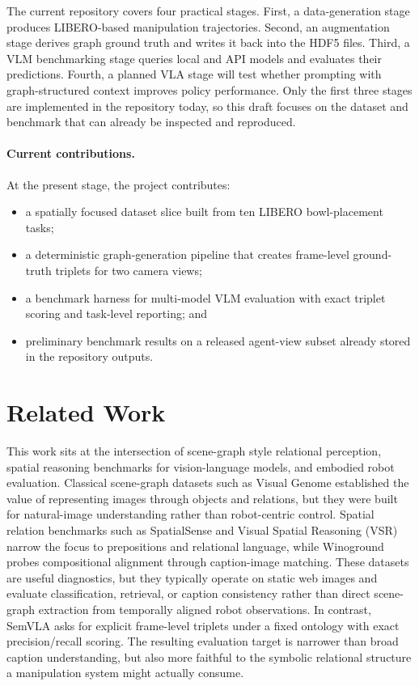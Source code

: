\documentclass{article}
\begin{document}
The current repository covers four practical stages. First, a data-generation stage produces LIBERO-based manipulation trajectories. Second, an augmentation stage derives graph ground truth and writes it back into the HDF5 files. Third, a VLM benchmarking stage queries local and API models and evaluates their predictions. Fourth, a planned VLA stage will test whether prompting with graph-structured context improves policy performance. Only the first three stages are implemented in the repository today, so this draft focuses on the dataset and benchmark that can already be inspected and reproduced.

\paragraph{Current contributions.}
At the present stage, the project contributes:
\begin{itemize}
    \item a spatially focused dataset slice built from ten LIBERO bowl-placement tasks;
    \item a deterministic graph-generation pipeline that creates frame-level ground-truth triplets for two camera views;
    \item a benchmark harness for multi-model VLM evaluation with exact triplet scoring and task-level reporting; and
    \item preliminary benchmark results on a released agent-view subset already stored in the repository outputs.
\end{itemize}

\section{Related Work}
This work sits at the intersection of scene-graph style relational perception, spatial reasoning benchmarks for vision-language models, and embodied robot evaluation. Classical scene-graph datasets such as Visual Genome \citep{krishna2017visualgenome} established the value of representing images through objects and relations, but they were built for natural-image understanding rather than robot-centric control. Spatial relation benchmarks such as SpatialSense \citep{yang2019spatialsense} and Visual Spatial Reasoning (VSR) \citep{liu2022vsr} narrow the focus to prepositions and relational language, while Winoground \citep{thrush2022winoground} probes compositional alignment through caption-image matching. These datasets are useful diagnostics, but they typically operate on static web images and evaluate classification, retrieval, or caption consistency rather than direct scene-graph extraction from temporally aligned robot observations. In contrast, SemVLA asks for explicit frame-level triplets under a fixed ontology with exact precision/recall scoring. The resulting evaluation target is narrower than broad caption understanding, but also more faithful to the symbolic relational structure a manipulation system might actually consume.
\end{document}
